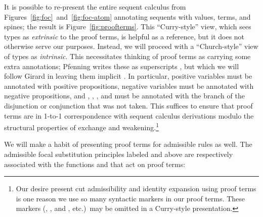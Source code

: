 \documentclass[acmtocl]{robtrans}\pdfoutput=1
\begin{document}
It is possible to re-present the entire sequent calculus from
Figures~\ref{fig:foc}~and~\ref{fig:foc-atom} annotating sequents with
values, terms, and spines; the result is
Figure~\ref{fig:proofterms}. This ``Curry-style'' view, which sees
types as {\it extrinsic} to the proof terms, is helpful as a
reference, but it does not otherwise serve our purposes. Instead, we
will proceed with a ``Church-style'' view of types as {\it
  intrinsic}. This necessitates thinking of proof terms as carrying
some extra annotations; Pfenning writes these as superscripts
\cite{pfenning08church}, but which we will follow Girard in leaving
them implicit \cite{girard89proofs}.  In particular, positive
variables  must be annotated with positive propositions,
negative variables  must be annotated with negative propositions,
and , , , and  must be
annotated with the branch of the disjunction or conjunction that was
not taken.  This suffices to ensure that proof terms are in 1-to-1
correspondence with sequent calculus derivations modulo the structural
properties of exchange and weakening.\footnote{Our desire present cut
  admissibility and identity expansion using proof terms is one reason
  we use so many syntactic markers in our proof terms. These markers
  (, , and , etc.)~may be omitted in a
  Curry-style presentation.}

We will make a habit of presenting proof terms for admissible rules as
well. The admissible focal substitution principles labeled 
and  above are respectively associated with the
functions  and  that act on proof terms:
\end{document}
